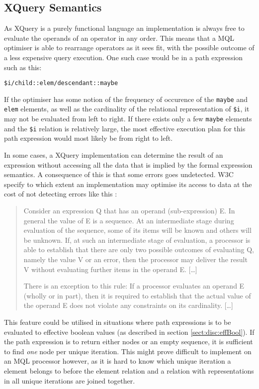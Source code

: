 \subsection{XQuery Semantics}

As XQuery is a purely functional language an implementation is always free to evaluate the operands of an operator
in any order\cite{w3c00}. This means that a MQL optimiser is able to rearrange operators as it sees fit, with the
possible outcome of a less expensive query execution. One such case would be in a path expression such as this:
\begin{center}
\texttt{\$i/child::elem/descendant::maybe}
\end{center}
If the optimiser has some notion of the frequency of occurence of the \texttt{maybe} and \texttt{elem} elements,
as well as the cardinality of the relational representation of \texttt{\$i}, it may not be evaluated from left to
right. If there exists only a few \texttt{maybe} elements and the \texttt{\$i} relation is relatively large, the
most effective execution plan for this path expression would most likely be from right to left.

In some cases, a XQuery implementation can determine the result of an expression without accessing all the data
that is implied by the formal expression semantics. A consequence of this is that some errors goes undetected. W3C
specify to which extent an implementation may optimise its access to data at the cost of not detecting errors
like this \cite{w3c00}:

\begin{quote}
Consider an expression Q that has an operand (sub-expression) E. In general the value of E is a sequence. At an
intermediate stage during evaluation of the sequence, some of its items will be known and others will be unknown.
If, at such an intermediate stage of evaluation, a processor is able to establish that there are only two possible
outcomes of evaluating Q, namely the value V or an error, then the processor may deliver the result V without
evaluating further items in the operand E. [\ldots]

There is an exception to this rule: If a processor evaluates an operand E (wholly or in part), then it is required
to establish that the actual value of the operand E does not violate any constraints on its cardinality. [\ldots] 
\end{quote}

This feature could be utilised in situations where path expressions is to be evaluated to effective boolean values
(as described in section \ref{sect:disc:effBool}). If the path expression is to return either nodes or an empty
sequence, it is sufficient to find \emph{one} node per unique iteration. This might prove difficult to implement
on an MQL processor however, as it is hard to know which unique iteration a element belongs to before the element
relation and a relation with representations in all unique iterations are joined together.

